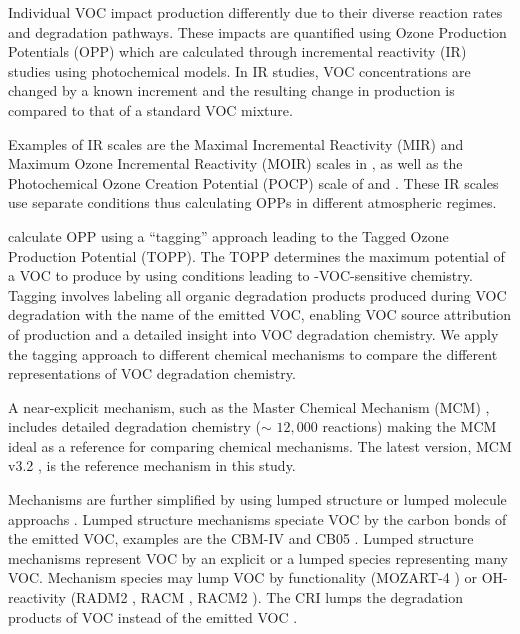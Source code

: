 Individual VOC impact  production differently due to their diverse reaction rates and degradation pathways. 
These impacts are quantified using Ozone Production Potentials (OPP) which are calculated through incremental reactivity (IR) studies using photochemical models. 
In IR studies, VOC concentrations are changed by a known increment and the resulting change in  production is compared to that of a standard VOC mixture. 

Examples of IR scales are the Maximal Incremental Reactivity (MIR) and Maximum Ozone Incremental Reactivity (MOIR) scales in \citet{Carter:1994}, as well as the Photochemical Ozone Creation Potential (POCP) scale of \citet{Derwent:1996} and \citet{Derwent:1998}. 
These IR scales use separate  conditions thus calculating OPPs in different atmospheric regimes.

\citet{Butler:2011} calculate OPP using a ``tagging'' approach leading to the Tagged Ozone Production Potential (TOPP). 
The TOPP determines the maximum potential of a VOC to produce  by using  conditions leading to -VOC-sensitive chemistry.
Tagging involves labeling all organic degradation products produced during VOC degradation with the name of the emitted VOC, enabling VOC source attribution of  production and a detailed insight into VOC degradation chemistry.
We apply the tagging approach to different chemical mechanisms to compare the different representations of VOC degradation chemistry. 

A near-explicit mechanism, such as the Master Chemical Mechanism (MCM) \citep{Jenkin:2003, Saunders:2003, Bloss:2005}, includes detailed degradation chemistry ($\sim$ $12,000$ reactions) making the MCM ideal as a reference for comparing chemical mechanisms.
The latest version, MCM v3.2 \citep{MCM_Site}, is the reference mechanism in this study.

Mechanisms are further simplified by using lumped structure or lumped molecule approachs \citep{Dodge:2000}. 
Lumped structure mechanisms speciate VOC by the carbon bonds of the emitted VOC, examples are the CBM-IV \citep{Gery:1989} and CB05 \citep{Yarwood:2005}.
Lumped structure mechanisms represent VOC by an explicit or a lumped species representing many VOC. 
Mechanism species may lump VOC by functionality (MOZART-4 \citep{Emmons:2010}) or OH-reactivity (RADM2 \citep{Stockwell:1990}, RACM \citep{Stockwell:1997}, RACM2 \citep{Goliff:2013}).
The CRI lumps the degradation products of VOC instead of the emitted VOC \citep{Jenkin:2008}.


